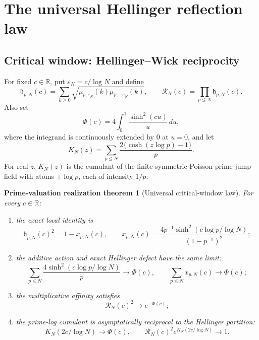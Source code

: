 \documentclass[11pt]{article}
\newtheorem*{maintheorem}{Prime-valuation realization theorem}
\theoremstyle{definition}
\theoremstyle{remark}
\newcommand{\R}{\mathbb R}
\begin{document}
\section{The universal Hellinger reflection law}\label{sec:phase-law}

\subsection{Critical window: Hellinger--Wick reciprocity}

For fixed \(c\in\R\), put \(\varepsilon_N=c/\log N\) and define
\[
 \mathfrak h_{p,N}(c)=
 \sum_{k\geq0}
 \sqrt{\mu_{p,\varepsilon_N}(k)\mu_{p,-\varepsilon_N}(k)},
 \qquad
 \mathcal R_N(c)=\prod_{p\leq N}\mathfrak h_{p,N}(c).
 \tag{3.1}\label{eq:reflected-critical-affinity}
\]
Also set
\[
 \Phi(c)=4\int_0^1\frac{\sinh^2(cu)}u\,du,
 \tag{3.2}\label{eq:universal-profile}
\]
where the integrand is continuously extended by \(0\) at \(u=0\), and let
\[
 K_N(z)=\sum_{p\leq N}\frac{2\{\cosh(z\log p)-1\}}p .
 \tag{3.3}\label{eq:prime-wick-cumulant}
\]
For real \(z\), \(K_N(z)\) is the cumulant of the finite symmetric Poisson prime-jump
field with atoms \(\pm\log p\), each of intensity \(1/p\).

\begin{maintheorem}[Universal critical-window law]\label{thm:critical-window}
For every \(c\in\R\):
\begin{enumerate}[label=\textup{(\roman*)}]
\item the exact local identity is
\[
 \mathfrak h_{p,N}(c)^2
 =1-x_{p,N}(c),\qquad
 x_{p,N}(c)=
 \frac{4p^{-1}\sinh^2(c\log p/\log N)}{(1-p^{-1})^2};
 \tag{3.4}\label{eq:exact-reflected-local-defect}
\]
\item the additive action and exact Hellinger defect have the same limit:
\[
 \sum_{p\leq N}\frac{4\sinh^2(c\log p/\log N)}p
 \longrightarrow\Phi(c),\qquad
 \sum_{p\leq N}x_{p,N}(c)\longrightarrow\Phi(c);
 \tag{3.5}\label{eq:additive-profile-limits}
\]
\item the multiplicative affinity satisfies
\[
 \mathcal R_N(c)^2\longrightarrow e^{-\Phi(c)};
 \tag{3.6}\label{eq:critical-hellinger-limit}
\]
\item the prime-log cumulant is asymptotically reciprocal to the Hellinger partition:
\[
 K_N(2c/\log N)\longrightarrow\Phi(c),\qquad
 \mathcal R_N(c)^2e^{K_N(2c/\log N)}\longrightarrow1.
 \tag{3.7}\label{eq:hellinger-wick-reciprocity}
\]
\end{enumerate}
\end{maintheorem}
\end{document}
